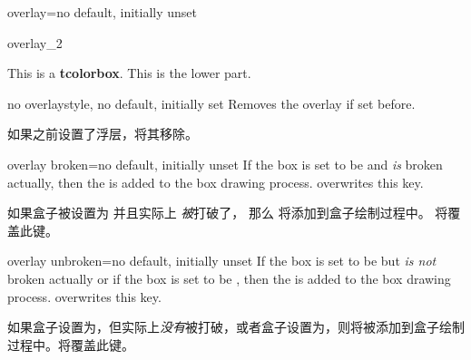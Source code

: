 \begin{docTcbKey}{overlay}{=}{no default, initially unset}
\begin{exdispExample}{overlay_2}
\begin{tcolorbox}[ribbonbox,title=My title]
This is a \textbf{tcolorbox}.
\tcblower
This is the lower part.
\end{tcolorbox}
\end{exdispExample}
\end{docTcbKey}




\begin{docTcbKey}{no overlay}{}{style, no default, initially set}
 Removes the overlay if set before.

如果之前设置了浮层，将其移除。
\end{docTcbKey}

\begin{docTcbKey}{overlay broken}{=}{no default, initially unset}
 If the box is set to be  and \emph{is} broken actually,
 then the  is added to the box drawing process.
  overwrites this key.

如果盒子被设置为  并且实际上 \emph{被}打破了， 那么  将添加到盒子绘制过程中。  将覆盖此键。

\end{docTcbKey}

\begin{docTcbKey}{overlay unbroken}{=}{no default, initially unset}
 If the box is set to be  but \emph{is not} broken actually
 or if the box is set to be ,
 then the  is added to the box drawing process.
  overwrites this key.

如果盒子设置为，但实际上\emph{没有}被打破，或者盒子设置为，则将被添加到盒子绘制过程中。将覆盖此键。

\end{docTcbKey}



